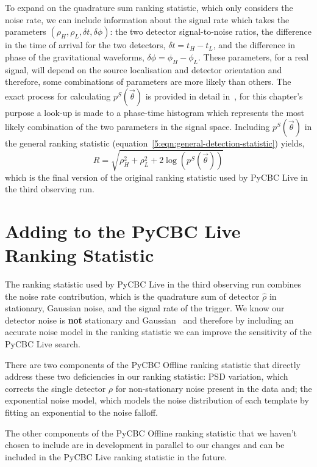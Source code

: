 To expand on the quadrature sum ranking statistic, which only considers the noise rate, we can include information about the signal rate which takes the parameters $(\rho_{H}, \rho_{L}, \delta t, \delta \phi)$: the two detector signal-to-noise ratios, the difference in the time of arrival for the two detectors, $\delta t = t_{H} - t_{L}$, and the difference in phase of the gravitational waveforms, $\delta \phi = \phi_{H} - \phi_{L}$. These parameters, for a real signal, will depend on the source localisation and detector orientation and therefore, some combinations of parameters are more likely than others. The exact process for calculating $p^{S}(\Vec{\theta})$ is provided in detail in~\cite{PyCBC:2017}, for this chapter's purpose a look-up is made to a phase-time histogram which represents the most likely combination of the two parameters in the signal space. Including $p^{S}(\Vec{\theta})$ in the general ranking statistic (equation~\ref{5:eqn:general-detection-statistic}) yields,
%
\begin{equation}
    R = \sqrt{\rho^{2}_{H} + \rho^{2}_{L} + 2 \log\left(p^{S}(\Vec{\theta})\right)}
    \label{5:eqn:original-statistic}
\end{equation}
%
which is the final version of the original ranking statistic used by PyCBC Live in the third observing run.

\section{\label{5:new-additions}Adding to the PyCBC Live Ranking Statistic}

The ranking statistic used by PyCBC Live in the third observing run combines the noise rate contribution, which is the quadrature sum of detector $\hat{\rho}$ in stationary, Gaussian noise, and the signal rate of the trigger. We know our detector noise is \textbf{not} stationary and Gaussian~\cite{LIGO_data_quality:2015} and therefore by including an accurate noise model in the ranking statistic we can improve the sensitivity of the PyCBC Live search.

There are two components of the PyCBC Offline ranking statistic that directly address these two deficiencies in our ranking statistic: PSD variation, which corrects the single detector $\rho$ for non-stationary noise present in the data and; the exponential noise model, which models the noise distribution of each template by fitting an exponential to the noise falloff.

The other components of the PyCBC Offline ranking statistic that we haven't chosen to include are in development in parallel to our changes and can be included in the PyCBC Live ranking statistic in the future.

